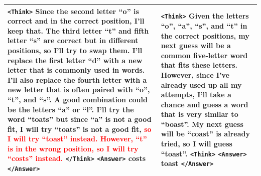 \begin{table}[h]
{\begin{tabular}{|p{7cm} | p{7cm}|}
        \texttt{<Think>} Since the second letter ``o'' is correct and in the correct position, I'll keep that. The third letter ``t'' and fifth letter ``s'' are correct but in different positions, so I'll try to swap them. I'll replace the first letter ``d'' with a new letter that is commonly used in words. I'll also replace the fourth letter with a new letter that is often paired with ``o'', ``t'', and ``s''. A good combination could be the letters ``a'' or ``l''. I'll try the word ``toats'' but since ``a'' is not a good fit, I will try ``toats'' is not a good fit, \textcolor{red}{so I will try ``toast'' instead. However, ``t'' is in the wrong position, so I will try ``costs'' instead.} \texttt{</Think>} \texttt{<Answer>} costs \texttt{</Answer>} & \texttt{<Think>} Given the letters ``o'', ``a'', ``s'', and ``t'' in the correct positions, my next guess will be a common five-letter word that fits these letters. However, since I've already used up all my attempts, I'll take a chance and guess a word that is very similar to ``boast''. My next guess will be ``coast'' is already tried, so I will guess ``toast''. \texttt{<Think>} \texttt{<Answer>} toast \texttt{</Answer>} \\
        \bottomrule
        \end{tabular}
    }
    \vspace{-0.3cm}
\end{table}
